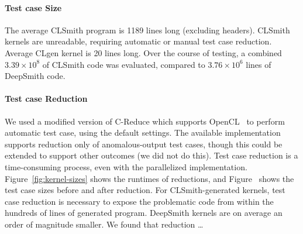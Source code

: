 \paragraph{Test case Size}
The average CLSmith program is 1189 lines long (excluding headers). CLSmith kernels are unreadable, requiring automatic or manual test case reduction.
Average CLgen kernel is 20 lines long.
Over the course of testing, a combined $3.39 \times 10^8$ of CLSmith code was evaluated, compared to $3.76 \times 10^6$ lines of DeepSmith code.

\paragraph{Test case Reduction} We used a modified version of C-Reduce which supports OpenCL~\cite{Pflanzer2016} to perform automatic test case, using the default settings. The available implementation supports reduction only of anomalous-output test cases, though this could be extended to support other outcomes (we did not do this). Test case reduction is a time-consuming process, even with the parallelized implementation. Figure~\ref{fig:kernel-sizes} shows the runtimes of reductions, and Figure~ shows the test case sizes before and after reduction. For CLSmith-generated kernels, test case reduction is necessary to expose the problematic code from within the hundreds of lines of generated program. DeepSmith kernels are on average an order of magnitude smaller. We found that reduction \ldots

